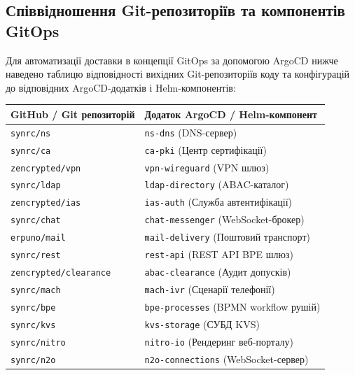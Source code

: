 \documentclass[12pt,a4paper]{article}
\begin{document}
\subsection{Співвідношення Git-репозиторіїв та компонентів GitOps}

Для автоматизації доставки в концепції GitOps за допомогою ArgoCD нижче наведено таблицю відповідності
вихідних Git-репозиторіїв коду та конфігурацій до відповідних ArgoCD-додатків і Helm-компонентів:

\vspace{6pt}
{\footnotesize
\begin{longtable}{L{6.5cm} L{7.5cm}}
\toprule
{}
\color{primary}\textbf{GitHub / Git репозиторій} & \color{primary}\textbf{Додаток ArgoCD / Helm-компонент} \\
\midrule\endhead\bottomrule\endfoot
\texttt{synrc/ns}            & \texttt{ns-dns} (DNS-сервер) \\[2pt]
\texttt{synrc/ca}            & \texttt{ca-pki} (Центр сертифікації) \\[2pt]
\texttt{zencrypted/vpn}      & \texttt{vpn-wireguard} (VPN шлюз) \\[2pt]
\texttt{synrc/ldap}          & \texttt{ldap-directory} (ABAC-каталог) \\[2pt]
\texttt{zencrypted/ias}      & \texttt{ias-auth} (Служба автентифікації) \\[2pt]
\texttt{synrc/chat}          & \texttt{chat-messenger} (WebSocket-брокер) \\[2pt]
\texttt{erpuno/mail}         & \texttt{mail-delivery} (Поштовий транспорт) \\[2pt]
\texttt{synrc/rest}          & \texttt{rest-api} (REST API BPE шлюз) \\[2pt]
\texttt{zencrypted/clearance}& \texttt{abac-clearance} (Аудит допусків) \\[2pt]
\texttt{synrc/mach}          & \texttt{mach-ivr} (Сценарії телефонії) \\[2pt]
\texttt{synrc/bpe}           & \texttt{bpe-processes} (BPMN workflow рушій) \\[2pt]
\texttt{synrc/kvs}           & \texttt{kvs-storage} (СУБД KVS) \\[2pt]
\texttt{synrc/nitro}         & \texttt{nitro-io} (Рендеринг веб-порталу) \\[2pt]
\texttt{synrc/n2o}           & \texttt{n2o-connections} (WebSocket-сервер) \\[2pt]

\end{longtable}}
\end{document}

